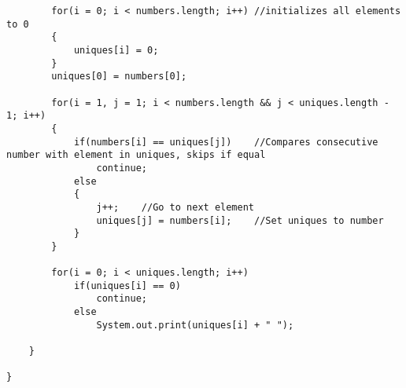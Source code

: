 \documentclass[ProgramminAssignment.tex]{subfiles}
\begin{document}
\begin{lstlisting}
		for(i = 0; i < numbers.length; i++)	//initializes all elements to 0
		{
			uniques[i] = 0;
		}
		uniques[0] = numbers[0];
		
		for(i = 1, j = 1; i < numbers.length && j < uniques.length - 1; i++)
		{
			if(numbers[i] == uniques[j])	//Compares consecutive number with element in uniques, skips if equal
				continue;
			else
			{
				j++;	//Go to next element
				uniques[j] = numbers[i];	//Set uniques to number
			}
		}
		
		for(i = 0; i < uniques.length; i++)
			if(uniques[i] == 0)
				continue;
			else
				System.out.print(uniques[i] + " ");
		
	}

}

\end{lstlisting}
\end{document}
